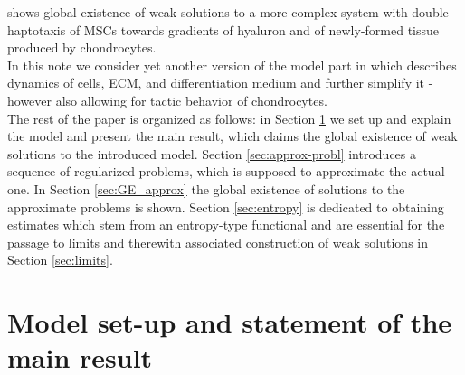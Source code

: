 \documentclass[a4paper,10pt]{article}
\theoremstyle{definition}
\begin{document}
\cite{Mohan2026} shows global existence of weak solutions to a more complex system with double haptotaxis of MSCs towards gradients of hyaluron and of newly-formed tissue produced by chondrocytes.\\[-2ex]
 
 \noindent
 In this note we consider yet another version of the model part in \cite{surulescu_AMM} which describes dynamics of cells, ECM, and differentiation medium and further simplify it - however also allowing for tactic behavior of chondrocytes.  \\[-2ex]
 
 \noindent
The rest of the paper is organized as follows: in Section \ref{sec:model-maintho} we set up and explain the model and present the main result, which claims the global existence of weak solutions to the introduced model. Section \ref{sec:approx-probl} introduces a sequence of regularized problems, which is supposed to approximate the actual one. In Section \ref{sec:GE_approx} the global existence of solutions to the approximate problems is shown. Section \ref{sec:entropy} is dedicated to obtaining estimates which stem from an entropy-type functional and are essential for the passage to limits and therewith  associated construction of weak solutions in Section \ref{sec:limits}.


\section{Model set-up and statement of the main result}\label{sec:model-maintho}

%
\end{document}
